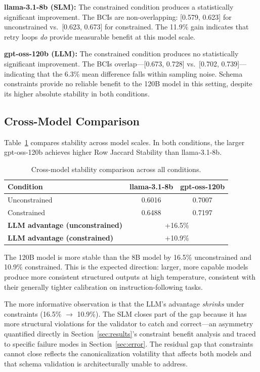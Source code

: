 \documentclass[sigconf]{acmart}
\begin{document}
\textbf{llama-3.1-\allowbreak 8b (SLM):} The constrained condition produces a statistically significant improvement. The BCIs are non-overlapping: [0.579, 0.623] for unconstrained vs.\ [0.623, 0.673] for constrained. The 11.9\% gain indicates that retry loops \emph{do} provide measurable benefit at this model scale.

\textbf{gpt-oss-\allowbreak 120b (LLM):} The constrained condition produces no statistically significant improvement. The BCIs overlap---[0.673, 0.728] vs.\ [0.702, 0.739]---indicating that the 6.3\% mean difference falls within sampling noise. Schema constraints provide no reliable benefit to the 120B model in this setting, despite its higher absolute stability in both conditions.

\subsection{Cross-Model Comparison}

Table~\ref{tab:crossmodel} compares stability across model scales. In both conditions, the larger gpt-oss-\allowbreak 120b achieves higher Row Jaccard Stability than llama-3.1-\allowbreak 8b.

\begin{table}[h]
\caption{Cross-model stability comparison across all conditions.}
\label{tab:crossmodel}
\small
\begin{tabular}{lcc}
\toprule
\textbf{Condition} & \textbf{llama-3.1-\allowbreak 8b} & \textbf{gpt-oss-\allowbreak 120b} \\
\midrule
Unconstrained & 0.6016 & 0.7007 \\
Constrained   & 0.6488 & 0.7197 \\
\midrule
\textbf{LLM advantage (unconstrained)} & \multicolumn{2}{c}{+16.5\%} \\
\textbf{LLM advantage (constrained)}   & \multicolumn{2}{c}{+10.9\%} \\
\bottomrule
\end{tabular}
\end{table}

The 120B model is more stable than the 8B model by 16.5\% unconstrained and 10.9\% constrained. This is the expected direction: larger, more capable models produce more consistent structured outputs at high temperature, consistent with their generally tighter calibration on instruction-following tasks.

The more informative observation is that the LLM's advantage \emph{shrinks} under constraints (16.5\% $\to$ 10.9\%). The SLM closes part of the gap because it has more structural violations for the validator to catch and correct---an asymmetry quantified directly in Section~\ref{sec:results}'s constraint benefit analysis and traced to specific failure modes in Section~\ref{sec:error}. The residual gap that constraints cannot close reflects the canonicalization volatility that affects both models and that schema validation is architecturally unable to address.
\end{document}
